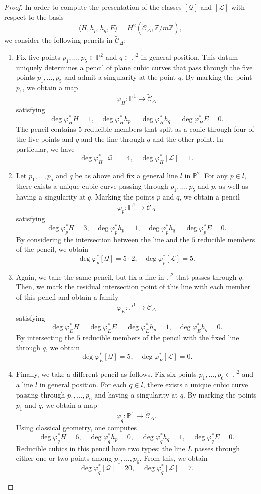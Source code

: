 \documentclass[10pt,a4paper]{amsart}
\begin{document}
\begin{proof}
In order to compute the presentation of the classes $[\mathcal Q]$ and $[\mathcal L]$ with respect to the basis $$\langle H, h_p, h_q, E \rangle = H^2(\widetilde{\mathcal C}_{\Delta}, \mathbb Z / m \mathbb Z),$$ we consider the following pencils in $\widetilde{\mathcal C}_\Delta$:
\begin{enumerate}
\item Fix five points $p_1, \dots, p_5 \in \mathbb P^2$ and $q \in \mathbb P^2$ in general position. This datum uniquely determines a pencil of plane cubic curves that pass through the five points $p_1, \dots, p_5$ and admit a singularity at the point $q$. By marking the point $p_1$, we obtain a map
$$\varphi_H \colon \mathbb P^1 \to \widetilde{\mathcal C}_\Delta$$
satisfying
$$\deg \varphi_H^* H = 1,\;\;\; \deg \varphi_H^* h_p = \deg \varphi_H^* h_q = \deg \varphi_H^* E = 0.$$
The pencil contains $5$ reducible members that split as a conic through four of the five points and $q$ and the line through $q$ and the other point. In particular, we have
\[
\deg \varphi^*_H [\mathcal Q] = 4, \quad \deg \varphi_H^* [\mathcal L] = 1.
\]
\item Let $p_1,\ldots, p_5$ and $q$ be as above and fix a general line $l$ in $\mathbb P^2$. For any $p\in l$, there exists a unique cubic curve passing through $p_1,\ldots, p_5$ and $p$, as well as having a singularity at $q$. Marking the points $p$ and $q$, we obtain a pencil
$$\varphi_p \colon \mathbb P^1 \to \widetilde{\mathcal C}_\Delta$$
satisfying
$$\deg \varphi_p^*H = 3, \;\;\; \deg \varphi_p^*h_p = 1,  \;\;\; \deg \varphi^*_p h_q = \deg \varphi^*_p E = 0.$$
By considering the intersection between the line and the $5$ reducible members of the pencil, we obtain 
$$\deg \varphi_p^* [\mathcal Q] = 5 \cdot 2, \;\;\;\deg \varphi_p^*[\mathcal{L}] = 5.$$
\item Again, we take the same pencil, but fix a line in $\mathbb P^2$ that passes through $q$. Then, we mark the residual intersection point of this line with each member of this pencil and obtain a family
$$\varphi_E \colon \mathbb P^1 \to \widetilde{\mathcal C}_\Delta$$
satisfying
$$\deg \varphi^*_E H = \deg \varphi^*_E E = \deg \varphi^*_E h_p = 1, \;\;\; \deg \varphi_E^* h_q = 0.$$
By intersecting the $5$ reducible members of the pencil with the fixed line through $q$, we obtain
$$\deg \varphi_E^* [\mathcal Q] =  5, \;\;\; \deg \varphi^*_E [\mathcal L] = 0.$$

\item Finally, we take a different pencil as follows. Fix six points $p_1, \ldots, p_6 \in \mathbb P^2$ and a line $l$ in general position. For each $q\in l$, there exists a unique cubic curve passing through $p_1,\ldots, p_6$ and having a singularity at $q$. By marking the points $p_1$ and $q$, we obtain a map
\[
\varphi_q \colon \mathbb P^1 \to \widetilde{\mathcal{C}}_\Delta.
\]
Using classical geometry, one computes
\[
\deg \varphi_q^* H = 6, \quad \deg \varphi_q^* h_p = 0, \quad \deg \varphi_q^* h_q = 1,\quad \deg \varphi_q^* E = 0.
\]
Reducible cubics in this pencil have two types: the line $L$ passes through either one or two points among $p_1,\ldots, p_6$. From this, we obtain
\[
\deg \varphi^*_q [\mathcal Q] = 20, \quad \deg \varphi_q^* [\mathcal L] = 7.
\]


\end{enumerate}
\end{proof}
\end{document}
